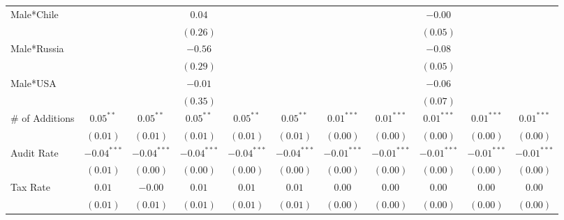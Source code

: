 \begin{table}
\begin{center}
\begin{tabular}{l c c c c c c c c c c }
Male*Chile         &               &               & $0.04$        &               &               &               &               & $-0.00$       &               &               \\
                   &               &               & $(0.26)$      &               &               &               &               & $(0.05)$      &               &               \\
Male*Russia        &               &               & $-0.56$       &               &               &               &               & $-0.08$       &               &               \\
                   &               &               & $(0.29)$      &               &               &               &               & $(0.05)$      &               &               \\
Male*USA           &               &               & $-0.01$       &               &               &               &               & $-0.06$       &               &               \\
                   &               &               & $(0.35)$      &               &               &               &               & $(0.07)$      &               &               \\
\# of Additions    & $0.05^{**}$   & $0.05^{**}$   & $0.05^{**}$   & $0.05^{**}$   & $0.05^{**}$   & $0.01^{***}$  & $0.01^{***}$  & $0.01^{***}$  & $0.01^{***}$  & $0.01^{***}$  \\
                   & $(0.01)$      & $(0.01)$      & $(0.01)$      & $(0.01)$      & $(0.01)$      & $(0.00)$      & $(0.00)$      & $(0.00)$      & $(0.00)$      & $(0.00)$      \\
Audit Rate         & $-0.04^{***}$ & $-0.04^{***}$ & $-0.04^{***}$ & $-0.04^{***}$ & $-0.04^{***}$ & $-0.01^{***}$ & $-0.01^{***}$ & $-0.01^{***}$ & $-0.01^{***}$ & $-0.01^{***}$ \\
                   & $(0.01)$      & $(0.00)$      & $(0.00)$      & $(0.00)$      & $(0.00)$      & $(0.00)$      & $(0.00)$      & $(0.00)$      & $(0.00)$      & $(0.00)$      \\
Tax Rate           & $0.01$        & $-0.00$       & $0.01$        & $0.01$        & $0.01$        & $0.00$        & $0.00$        & $0.00$        & $0.00$        & $0.00$        \\
                   & $(0.01)$      & $(0.01)$      & $(0.01)$      & $(0.01)$      & $(0.01)$      & $(0.00)$      & $(0.00)$      & $(0.00)$      & $(0.00)$      & $(0.00)$      \\

\end{tabular}
\end{center}
\end{table}
